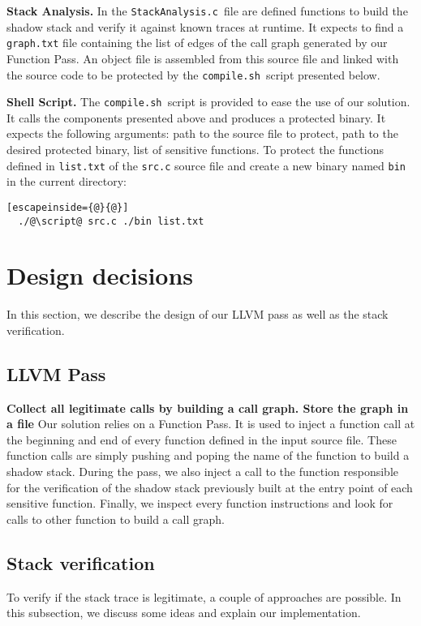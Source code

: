 \documentclass{llncs}
\newcommand{\todo}[1]{\textbf{\color{red} #1}}
\newcommand{\stacka}{\texttt{StackAnalysis.c }}
\newcommand{\script}{\texttt{compile.sh }}
\begin{document}
\noindent\textbf{Stack Analysis.}\newline
In the \stacka file are defined functions to build the shadow stack and verify it against known traces at runtime. It expects to find a \texttt{graph.txt} file containing the list of edges of the call graph generated by our Function Pass. An object file is assembled from this source file and linked with the source code to be protected by the \script script presented below.\newline

\noindent\textbf{Shell Script.}\newline
The \script script is provided to ease the use of our solution. It calls the components presented above and produces a protected binary. It expects the following arguments: path to the source file to protect, path to the desired protected binary, list of sensitive functions. To protect the functions defined in \texttt{list.txt} of the \texttt{src.c} source file and create a new binary named \texttt{bin} in the current directory:
\begin{lstlisting}[escapeinside={@}{@}]
  ./@\script@ src.c ./bin list.txt
\end{lstlisting}
\newpage

\section{Design decisions}
In this section, we describe the design of our LLVM pass as well as the stack verification.

\subsection{LLVM Pass}
\todo{Collect all legitimate calls by building a call graph. Store the graph in a file}
Our solution relies on a Function Pass. It is used to inject a function call at the beginning and end of every function defined in the input source file. These function calls are simply pushing and poping the name of the function to build a shadow stack. During the pass, we also inject a call to the function responsible for the verification of the shadow stack previously built at the entry point of each sensitive function. Finally, we inspect every function instructions and look for calls to other function to build a call graph.

\subsection{Stack verification}
To verify if the stack trace is legitimate, a couple of approaches are possible. In this subsection, we discuss some ideas and explain our implementation.
\end{document}
